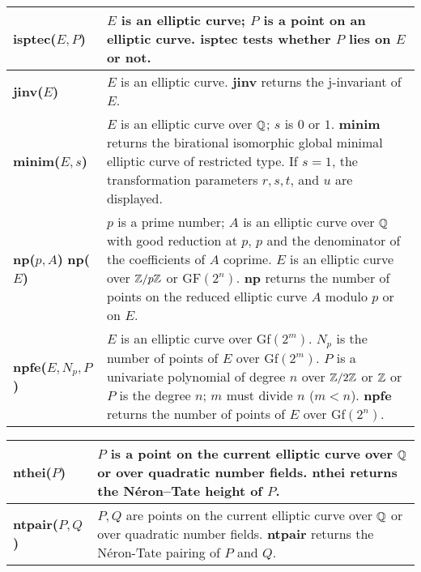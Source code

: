 {\begin{tabular}{|p{1.95in}|p{3.83in}|}
{\bf isptec($E,P$)} &
$E$ is an elliptic curve; $P$ is a point on an elliptic curve.\newline
{\bf isptec} tests whether $P$ lies on $E$ or not. \\ \hline

{\bf jinv($E$)} &
$E$ is an elliptic curve.\newline
{\bf jinv} returns the j-invariant of $E$. \\ \hline

{\bf minim($E,s$)} &
$E$ is an elliptic curve over $\mbox{$\mathbb Q$}$; $s$ is $0$ or $1$.\newline
{\bf minim} returns the birational isomorphic global minimal elliptic
curve of restricted type. If $s=1$, the transformation parameters
$r,s,t$, and $u$ are displayed.\\ \hline

{\bf np($p,A$)}\newline
{\bf np($E$)} &
$p$ is a prime number; $A$ is an elliptic curve over $\mbox{$\mathbb Q$}$ with good
reduction at $p$, $p$ and the denominator of the coefficients of $A$ coprime.
$E$ is an elliptic curve over $\mbox{$\mathbb Z$}/p\mbox{$\mathbb Z$}$ or GF$(2^n)$.\newline
{\bf np} returns the number of points on the reduced elliptic curve $A$ mo\-du\-lo $p$
or on $E$.\\ \hline

{\bf npfe($E, N_p, P$)} &
$E$ is an elliptic curve over Gf$(2^m)$. $N_p$ is the number of points
of $E$ over Gf$(2^m)$. $P$ is a univariate polynomial of degree $n$ over $\mbox{$\mathbb Z$}/2\mbox{$\mathbb Z$}$
or $\mbox{$\mathbb Z$}$ or $P$ is the degree $n$; $m$ must divide $n$ ($m < n$).\newline
{\bf npfe} returns the number of points of $E$ over Gf$(2^n)$.\\ \hline
\end{tabular}

\newpage

\begin{tabular}{|p{1.95in}|p{3.83in}|} \hline

{\bf nthei($P$)} &
$P$ is a point on the current elliptic curve over $\mbox{$\mathbb Q$}$ or over 
quadratic number fields.\newline
{\bf nthei} returns the N\'eron--Tate height of $P$.\\ \hline

{\bf ntpair($P,Q$)} &
$P,Q$ are points on the current elliptic curve over $\mbox{$\mathbb Q$}$ or over 
quadratic number fields.\newline
{\bf ntpair} returns the N\'eron-Tate pairing of $P$ and $Q$.\\ \hline


\end{tabular}}
